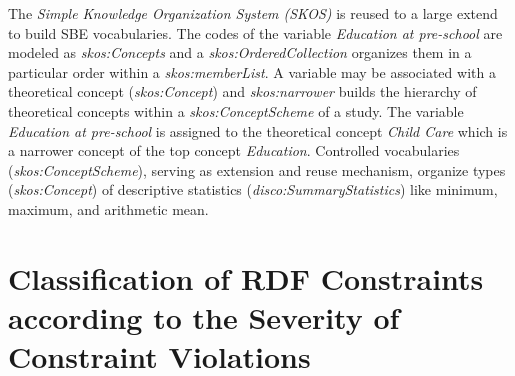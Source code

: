 \documentclass{llncs}
\begin{document}
The \emph{Simple Knowledge Organization System (SKOS)} is reused to a large extend to build SBE vocabularies.
The codes of the variable \emph{Education at pre-school} are modeled as \emph{skos:Concepts} and 
a \emph{skos:OrderedCollection} organizes them in a particular order within a \emph{skos:memberList}.
A variable may be associated with a theoretical concept (\emph{skos:Concept}) and \emph{skos:narrower} builds the hierarchy of theoretical concepts within a \emph{skos:ConceptScheme} of a study.
The variable \emph{Education at pre-school} is assigned to the theoretical concept \emph{Child Care} which is a narrower concept of the top concept \emph{Education}.
Controlled vocabularies (\emph{skos:ConceptScheme}), serving as extension and reuse mechanism,
organize types (\emph{skos:Concept}) of descriptive statistics (\emph{disco:SummaryStatistics}) like minimum, maximum, and arithmetic mean.

\section{Classification of RDF Constraints according to the Severity of Constraint Violations}
\end{document}
